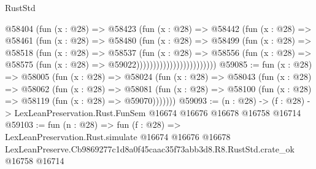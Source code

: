 \begin{lexlean}{RustStd}
\begin{coremodule}
                              @58404
                                (fun (x : @28) =>
                                @58423
                                  (fun (x : @28) =>
                                  @58442
                                    (fun (x : @28) =>
                                    @58461
                                      (fun (x : @28) =>
                                      @58480
                                        (fun (x : @28) =>
                                        @58499
                                          (fun (x : @28) =>
                                          @58518
                                            (fun (x : @28) =>
                                            @58537
                                              (fun (x : @28) =>
                                              @58556
                                                (fun (x : @28) =>
                                                @58575
                                                  (fun (x : @28) => @59022))))))))))))))))))))))))
@59085 := fun (x : @28) =>
  @58005
    (fun (x : @28) =>
    @58024
      (fun (x : @28) =>
      @58043
        (fun (x : @28) =>
        @58062
          (fun (x : @28) =>
          @58081 (fun (x : @28) => @58100 (fun (x : @28) => @58119 (fun (x : @28) => @59070)))))))
@59093 := (n : @28) ->
  (f : @28) -> LexLeanPreservation.Rust.FunSem @16674 @16676 @16678 @16758 @16714
@59103 := fun (n : @28) =>
  fun (f : @28) =>
  LexLeanPreservation.Rust.simulate
    @16674
    @16676
    @16678
    LexLeanPreserve.Cb9869277c1d8a0f45caac35f73abb3d8.R8.RustStd.crate_ok
    @16758
    @16714
\end{coremodule}
\end{lexlean}
